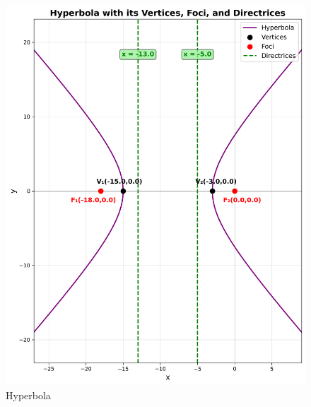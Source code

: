 \documentclass[journal]{IEEEtran}
\begin{document}
\begin{figure}
    \centering
    \includegraphics[width=\columnwidth]{figs/fig3.png}
    \caption{Hyperbola}
    \label{fig:figs/fig3.png}
\end{figure}
\end{document}
